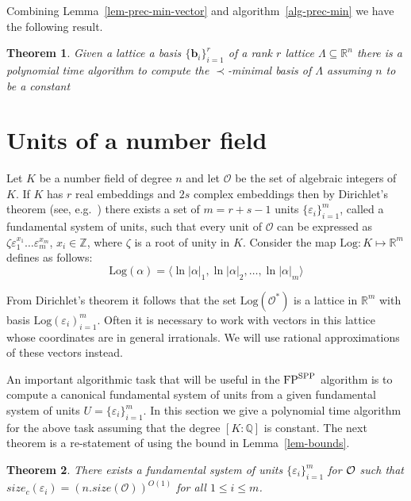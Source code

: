 \documentclass{article}
\newcommand{\Log}[1]{\mathrm{Log}\left(#1\right)}
\newcommand{\FP}{{\rm FP}}
\newcommand{\SPP}{{\rm SPP}}
\newtheorem{theorem}{Theorem}[section]
\theoremstyle{definition}\newtheorem{remark}[theorem]{Remark}
\renewcommand{\vector}[1]{\ensuremath{\mathbf{#1}}}
\begin{document}
Combining Lemma~\ref{lem-prec-min-vector} and
algorithm~\ref{alg-prec-min} we have the following result.
\begin{theorem}\label{thm-can-basis}
  Given a lattice a basis $\{ \vector{b}_i \}_{i=1}^r$ of a rank $r$
  lattice $\Lambda \subseteq \mathbb{R}^n$ there is a polynomial time
  algorithm to compute the $\prec$-minimal basis of $\Lambda$ assuming
  $n$ to be a constant
\end{theorem}

\section{Units of a number field}\label{four}

Let $K$ be a number field of degree $n$ and let $\mathcal{O}$ be the
set of algebraic integers of $K$. If $K$ has $r$ real embeddings and
$2s$ complex embeddings then by Dirichlet's theorem (see, e.g.\ 
\cite{cohen:1993}) there exists a set of $m = r + s - 1$ units
$\{\varepsilon_i\}_{i=1}^m$, called a fundamental system of units, such
that every unit of $\mathcal{O}$ can be expressed as $\zeta
\varepsilon_1^{x_1} \ldots \varepsilon_m^{x_m}$, $x_i \in \mathbb{Z}$,
where $\zeta$ is a root of unity in $K$. Consider the map
$\textrm{Log}: K \mapsto \mathbb{R}^m$ defines as follows:
\[
\Log{\alpha} = \langle \ln |\alpha|_1,\ln |\alpha|_2,\ldots,\ln
|\alpha|_m \rangle
\]

{From} Dirichlet's theorem it follows that the set
$\Log{\mathcal{O}^*}$ is a lattice in $\mathbb{R}^m$ with basis
$\Log{\varepsilon_i}_{i=1}^m$. Often it is necessary to work with
vectors in this lattice whose coordinates are in general irrationals.
We will use rational approximations of these vectors instead.

An important algorithmic task that will be useful in the $\FP^{\SPP}$
algorithm is to compute a canonical fundamental system of units from a
given fundamental system of units $U = \{ \varepsilon_i \}_{i=1}^m$. In
this section we give a polynomial time algorithm for the above task
assuming that the degree $[K:\mathbb{Q}]$ is constant. The next
theorem is a re-statement of \cite[Lemma 16]{thiel94class} using the
bound in Lemma~\ref{lem-bounds}.

\begin{theorem}{\rm\cite{thiel94class}}\label{thm-small-compact}
  There exists a fundamental system of units $\{\varepsilon_i\}_{i=1}^m$
  for $\cal{O}$ such that $size_c(\varepsilon_i) =
  (n.size(\mathcal{O}))^{O(1)}$ for all $1 \leq i \leq m$.
\end{theorem}
\end{document}
